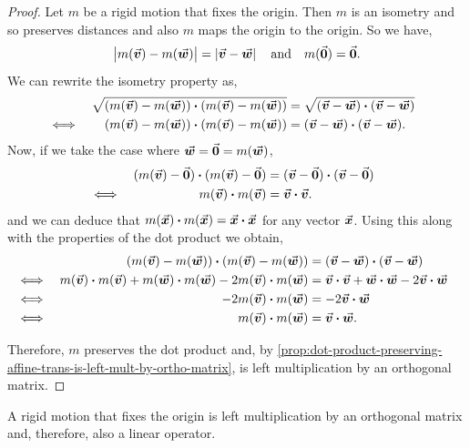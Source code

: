 \documentclass[MathsNotesBase.tex]{subfiles}
\begin{document}
{	\bigskip
	\begin{proof}
		Let $m$ be a rigid motion that fixes the origin. Then $m$ is an isometry and so preserves distances and also $m$ maps the origin to the origin. So we have,
		\[ \norm{m(\v) - m(\w)} = \norm{\v - \w} \eqand m(\0) = \0. \]
		We can rewrite the isometry property as,
		\begin{align*}
		&& \sqrt{(m(\v) - m(\w))\dotprod(m(\v) - m(\w))} &= \sqrt{(\v - \w)\dotprod(\v - \w)}\\
		&\iff & (m(\v) - m(\w))\dotprod(m(\v) - m(\w)) &= (\v - \w)\dotprod(\v - \w). &\sidecomment{}
		\end{align*}
		Now, if we take the case where ${ \w = \0 = m(\w) }$,
		\begin{align*}
		&& (m(\v) - \0)\dotprod(m(\v) - \0) &= (\v - \0)\dotprod(\v - \0) \\
		&\iff & m(\v) \dotprod m(\v) &= \v \dotprod \v. &\sidecomment{}
		\end{align*}
		and we can deduce that ${ m(\x) \dotprod m(\x) = \x \dotprod \x }$ for any vector $\x$. Using this along with the properties of the dot product we obtain,
		\begin{align*}
		&& (m(\v) - m(\w))\dotprod(m(\v) - m(\w)) &= (\v - \w)\dotprod(\v - \w) \\
		&\iff & m(\v)\dotprod m(\v) + m(\w)\dotprod m(\w) - 2m(\v)\dotprod m(\w) &= \v\dotprod\v + \w\dotprod\w - 2\v\dotprod\w &\sidecomment{} \\
		&\iff & -2m(\v)\dotprod m(\w) &= -2\v\dotprod\w &\sidecomment{} \\
		&\iff & m(\v)\dotprod m(\w) &= \v\dotprod\w. &\sidecomment{}
		\end{align*}
		
		Therefore, $m$ preserves the dot product and, by \autoref{prop:dot-product-preserving-affine-trans-is-left-mult-by-ortho-matrix}, is left multiplication by an orthogonal matrix.
	\end{proof}
	\begin{corollary}
		\label{coro:isometry-fixes-origin-left-mult-by-orthogonal-matrix}
		A rigid motion that fixes the origin is left multiplication by an orthogonal matrix and, therefore, also a linear operator.
	\end{corollary}

}
\end{document}
